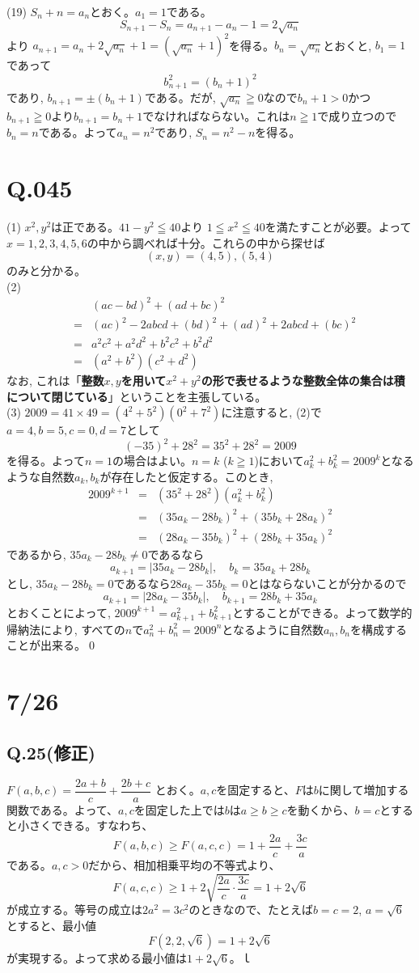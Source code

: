 \documentclass[twocolumn]{jbook}
\theoremstyle{definition}
\newcommand{\beqn}{\begin{eqnarray*}}
\newcommand{\eeqn}{\end{eqnarray*}}
\renewcommand{\leq}{\leqq}
\renewcommand{\geq}{\geqq}
\begin{document}
(19) $S_n + n = a_n$とおく。$a_1 = 1$である。
\[S_{n+1} - S_n = a_{n+1} - a_n -1 = 2\sqrt{a_n}\]
より $a_{n+1} = a_n + 2\sqrt{a_n} + 1 = (\sqrt{a_n} + 1)^2$を得る。$b_n = \sqrt{a_n}$とおくと, $b_1 = 1$であって
\[b_{n+1}^2 = (b_n + 1)^2 \]
であり, $b_{n+1} = \pm (b_n + 1)$である。だが, $\sqrt{a_n} \geq 0$なので$b_n + 1 > 0$かつ$b_{n+1} \geq 0$より$b_{n+1} = b_n + 1$でなければならない。これは$n\geq 1$で成り立つので$b_n = n$である。よって$a_n = n^2$であり, $S_n = n^2 - n$を得る。


\section{Q.045}
(1) $x^2,y^2$は正である。$41-y^2 \leq 40$より $1\leq x^2 \leq 40$を満たすことが必要。よって$x=1,2,3,4,5,6$の中から調べれば十分。これらの中から探せば
\[(x,y) = (4,5), (5,4)\]
のみと分かる。\\
(2) \beqn
&&(ac-bd)^2 + (ad+bc)^2\\
&=& (ac)^2 -2abcd + (bd)^2 + (ad)^2 + 2abcd + (bc)^2\\
&=& a^2c^2 + a^2d^2 + b^2c^2 + b^2d^2\\
&=& (a^2+b^2)(c^2+d^2)
\eeqn
なお, これは「\textbf{整数$x,y$を用いて$x^2+y^2$の形で表せるような整数全体の集合は積について閉じている}」ということを主張している。\\
(3) $2009 = 41\times 49 = (4^2+5^2)(0^2 + 7^2)$に注意すると, (2)で$a=4,b=5,c=0,d=7$として
\[(-35)^2 + 28^2 = 35^2 + 28^2 = 2009\]
を得る。よって$n=1$の場合はよい。$n=k$ ($k\geq 1$)において$a_k^2+ b_k^2 = 2009^{k}$となるような自然数$a_k,b_k$が存在したと仮定する。このとき, 
\beqn
2009^{k+1} &=& (35^2 + 28^2)(a_k^2+b_k^2)\\
&=& (35a_k - 28b_k)^2 + (35b_k + 28a_k)^2\\
&=& (28a_k - 35b_k)^2 + (28b_k + 35a_k)^2
\eeqn
であるから, $35a_k -28b_k \neq 0$であるなら
\[a_{k+1} = |35a_k - 28b_k|, \quad b_k = 35a_k + 28b_k\]
とし, $35a_k -28b_k = 0$であるなら$28a_k - 35b_k = 0$とはならないことが分かるので
\[a_{k+1} = |28a_k - 35b_k|,\quad b_{k+1} = 28b_k + 35a_k\]
とおくことによって, $2009^{k+1} = a_{k+1}^2 + b_{k+1}^2$とすることができる。よって数学的帰納法により, すべての$n$で$a_n^2 + b_n^2 = 2009^{n}$となるように自然数$a_n,b_n$を構成することが出来る。\qed



\section*{7/26}
\subsection*{Q.25(修正)}
$F(a, b, c)=\dfrac{2a+b}{c}+\dfrac{2b+c}{a}$ とおく。$a, c$を固定すると、$F$は$b$に関して増加する関数である。よって、$a, c$を固定した上では$b$は$a\ge b\ge c$を動くから、$b=c$とすると小さくできる。すなわち、
\[ F(a, b, c)\ge F(a, c, c)=1+\frac{2a}{c}+\frac{3c}{a} \]
である。$a, c>0$だから、相加相乗平均の不等式より、
\[ F(a, c, c)\ge 1+2\sqrt{\frac{2a}{c}\cdot\frac{3c}{a}}=1+2\sqrt{6} \]
が成立する。等号の成立は$2a^2=3c^2$のときなので、たとえば$b=c=2$, $a=\sqrt{6}$とすると、最小値
\[ F(2, 2, \sqrt{6})=1+2\sqrt{6} \]
が実現する。よって求める最小値は$1+2\sqrt{6}$。ｌ
\end{document}
